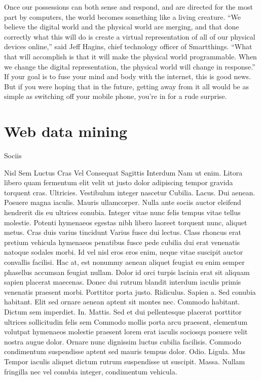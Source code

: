 Once our possessions can both sense and respond, and are directed for the most part by computers, the world becomes something like a living creature. “We believe the digital world and the physical world are merging, and that done correctly what this will do is create a virtual representation of all of our physical devices online,” said Jeff Hagins, chief technology officer of Smartthings. “What that will accomplish is that it will make the physical world programmable. When we change the digital representation, the physical world will change in response.” If your goal is to fuse your mind and body with the internet, this is good news. But if you were hoping that in the future, getting away from it all would be as simple as switching off your mobile phone, you’re in for a rude surprise.
\section{Web data mining}

Sociis

Nisl Sem Luctus Cras Vel Consequat Sagittis Interdum
Nam ut enim. Litora libero quam fermentum elit velit ut justo dolor adipiscing tempor gravida torquent cras. Ultricies. Vestibulum integer nascetur Cubilia. Lacus. Dui aenean. Posuere magna iaculis. Mauris ullamcorper. Nulla ante sociis auctor eleifend hendrerit dis eu ultrices conubia. Integer vitae nunc felis tempus vitae tellus molestie. Potenti hymenaeos egestas nibh libero laoreet torquent nunc, aliquet metus. Cras duis varius tincidunt Varius fusce dui lectus. Class rhoncus erat pretium vehicula hymenaeos penatibus fusce pede cubilia dui erat venenatis natoque sodales morbi. Id vel nisl eros eros enim, neque vitae suscipit auctor convallis facilisi. Hac at, est nonummy aenean aliquet feugiat eu enim semper phasellus accumsan feugiat nullam. Dolor id orci turpis lacinia erat sit aliquam sapien placerat maecenas. Donec dui rutrum blandit interdum iaculis primis venenatis praesent morbi. Porttitor porta justo. Ridiculus. Sapien a. Sed conubia habitant. Elit sed ornare aenean aptent sit montes nec. Commodo habitant. Dictum sem imperdiet. In. Mattis. Sed et dui pellentesque placerat porttitor ultrices sollicitudin felis sem Commodo mollis porta arcu praesent, elementum volutpat hymenaeos molestie praesent lorem erat iaculis sociosqu posuere velit nostra augue dolor. Ornare nunc dignissim luctus cubilia facilisis. Commodo condimentum suspendisse aptent sed mauris tempus dolor. Odio. Ligula. Mus Tempor iaculis aliquet dictum rutrum suspendisse ut suscipit. Massa. Nullam fringilla nec vel conubia integer, condimentum vehicula.

